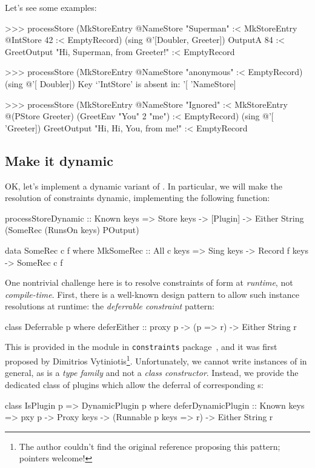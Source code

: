 \documentclass[demotion-paper.tex]{subfiles}
\begin{document}
Let's see some examples:
\begin{repl}
>>> processStore 
      (MkStoreEntry @NameStore "Superman"
        :< MkStoreEntry @IntStore 42
        :< EmptyRecord)
      (sing @'[Doubler, Greeter])
OutputA 84
  :< GreetOutput "Hi, Superman, from Greeter!"
  :< EmptyRecord

>>> processStore 
      (MkStoreEntry @NameStore "anonymous"
        :< EmptyRecord) 
      (sing @'[ Doubler])
Key `'IntStore' is absent in: '[ 'NameStore]

>>> processStore 
      (MkStoreEntry @NameStore "Ignored"
        :< MkStoreEntry @(PStore Greeter) 
            (GreetEnv "You" 2 "me")
        :< EmptyRecord) (sing @'[ 'Greeter])
GreetOutput "Hi, Hi, You, from me!" :< EmptyRecord
\end{repl}

\subsection{Make it dynamic}
OK, let's implement a dynamic variant of .
In particular, we will make the resolution of  constraints dynamic, implementing the following function:

\begin{code}
processStoreDynamic :: Known keys
  => Store keys -> [Plugin]
  -> Either String 
    (SomeRec (RunsOn keys) POutput)

data SomeRec c f where
  MkSomeRec :: All c keys => Sing keys
    -> Record f keys -> SomeRec c f
\end{code}

One nontrivial challenge here is to resolve constraints of form  at \emph{runtime}, not \emph{compile-time}.
First, there is a well-known design pattern to allow such instance resolutions at runtime: the \emph{deferrable constraint} pattern:
\begin{code}
class Deferrable p where
  deferEither :: proxy p -> (p => r) 
              -> Either String r
\end{code}
This is provided in the module  in \texttt{constraints} package~\cite{Kmett:2020ab}, and it was first proposed by Dimitrios Vytiniotis\footnote{The author couldn't find the original reference proposing this pattern; pointers welcome!}.
Unfortunately, we cannot write instances of  in general, as  is a \emph{type family} and not a \emph{class constructor}.
Instead, we provide the dedicated class  of plugins which allow the deferral of corresponding s:
\begin{code}
class IsPlugin p => DynamicPlugin p where
  deferDynamicPlugin
    :: Known keys
    => pxy p -> Proxy keys
    -> (Runnable p keys => r) -> Either String r
\end{code}
\end{document}
